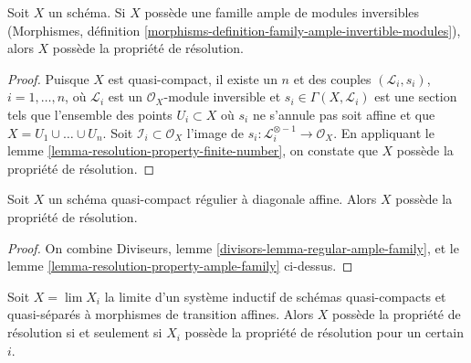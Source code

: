 \begin{lemma}
\label{lemma-resolution-property-ample-family}
Soit $X$ un schéma. Si $X$ possède une famille ample de modules inversibles
(Morphismes, définition
\ref{morphisms-definition-family-ample-invertible-modules}),
alors $X$ possède la propriété de résolution.
\end{lemma}

\begin{proof}
Puisque $X$ est quasi-compact, il existe un $n$ et des couples
$(\mathcal{L}_i, s_i)$, $i = 1, \ldots, n$, où
$\mathcal{L}_i$ est un $\mathcal{O}_X$-module inversible et
$s_i \in \Gamma(X, \mathcal{L}_i)$ est une section
tels que l'ensemble des points $U_i \subset X$ où $s_i$ ne s'annule pas
soit affine et que $X = U_1 \cup \ldots \cup U_n$.
Soit $\mathcal{I}_i \subset \mathcal{O}_X$ l'image
de $s_i : \mathcal{L}_i^{\otimes -1} \to \mathcal{O}_X$.
En appliquant le lemme \ref{lemma-resolution-property-finite-number},
on constate que $X$ possède la propriété de résolution.
\end{proof}

\begin{lemma}
\label{lemma-regular-resolution-property}
Soit $X$ un schéma quasi-compact régulier à diagonale affine.
Alors $X$ possède la propriété de résolution.
\end{lemma}

\begin{proof}
On combine Diviseurs, lemme \ref{divisors-lemma-regular-ample-family}, et le
lemme \ref{lemma-resolution-property-ample-family} ci-dessus.
\end{proof}

\begin{lemma}
\label{lemma-resolution-property-descends}
Soit $X = \lim X_i$ la limite d'un système inductif de schémas quasi-compacts
et quasi-séparés à morphismes de transition affines.
Alors $X$ possède la propriété de résolution si et seulement si $X_i$ possède
la propriété de résolution pour un certain $i$.
\end{lemma}

